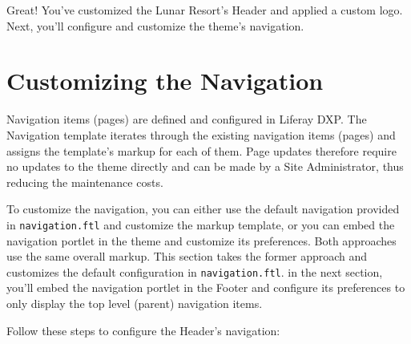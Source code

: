 Great! You've customized the Lunar Resort's Header and applied a custom
logo. Next, you'll configure and customize the theme's navigation.

\chapter{Customizing the Navigation}\label{customizing-the-navigation}

Navigation items (pages) are defined and configured in Liferay DXP. The
Navigation template iterates through the existing navigation items
(pages) and assigns the template's markup for each of them. Page updates
therefore require no updates to the theme directly and can be made by a
Site Administrator, thus reducing the maintenance costs.

To customize the navigation, you can either use the default navigation
provided in \texttt{navigation.ftl} and customize the markup template,
or you can embed the navigation portlet in the theme and customize its
preferences. Both approaches use the same overall markup. This section
takes the former approach and customizes the default configuration in
\texttt{navigation.ftl}. in the next section, you'll embed the
navigation portlet in the Footer and configure its preferences to only
display the top level (parent) navigation items.

Follow these steps to configure the Header's navigation:

